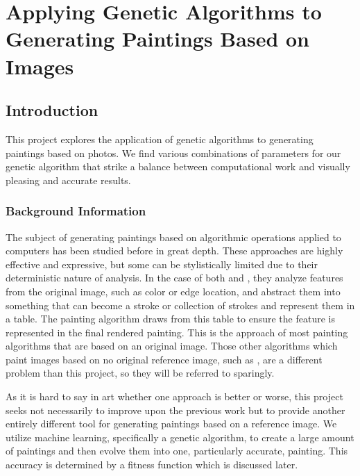 


\chapter{Applying Genetic Algorithms to Generating Paintings Based on Images}
\section{Introduction}

This project explores the application of genetic algorithms to generating paintings based on photos. We find various combinations of parameters for our genetic algorithm that strike a balance between computational work and visually pleasing and accurate results. 

\subsection{Background Information}
The subject of generating paintings based on algorithmic operations applied to computers has been studied before in great depth.\cite{synergistic}\cite{monet}\cite{organicpainting} These approaches are highly effective and expressive, but some can be stylistically limited due to their deterministic nature of analysis. In the case of both \cite{synergistic} and \cite{monet}, they analyze features from the original image, such as color or edge location, and abstract them into something that can become a stroke or collection of strokes and represent them in a table. The painting algorithm draws from this table to ensure the feature is represented in the final rendered painting. This is the approach of most painting algorithms that are based on an original image. Those other algorithms which paint images based on no original reference image, such as \cite{organicpainting}, are a different problem than this project, so they will be referred to sparingly. 

As it is hard to say in art whether one approach is better or worse, this project seeks not necessarily to improve upon the previous work but to provide another entirely different tool for generating paintings based on a reference image. We utilize machine learning, specifically a genetic algorithm, to create a large amount of paintings and then evolve them into one, particularly accurate, painting. This accuracy is determined by a fitness function which is discussed later. 

